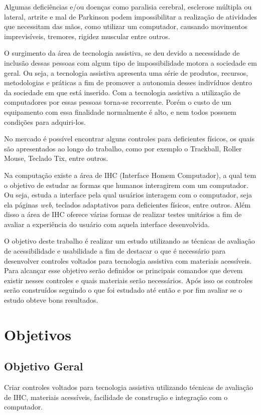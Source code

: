 \documentclass[
	12pt,			%
	openright,		%
	oneside,			%
	a4paper,			%
	chapter=TITLE,		%
	english,			%
	brazil,			%
	]{abntex2}
\begin{document}
Algumas deficiências e/ou doenças como paralisia cerebral, esclerose múltipla ou lateral, artrite e mal de Parkinson podem impossibilitar a realização de atividades que necessitam das mãos, como utilizar um computador, causando movimentos imprevisíveis, tremores, rigidez muscular entre outros.

O surgimento da área de tecnologia assistiva, se deu devido a necessidade de inclusão dessas pessoas com algum tipo de impossibilidade motora a sociedade em geral. Ou seja, a tecnologia assistiva apresenta uma série de produtos, recursos, metodologias e práticas a fim de promover a autonomia desses indivíduos dentro da sociedade em que está inserido. Com a tecnologia assistiva a utilização de computadores por essas pessoas torna-se recorrente. Porém o custo de um equipamento com essa finalidade normalmente é alto, e nem todos possuem condições para adquiri-los.

No mercado é possível encontrar alguns controles para deficientes físicos, os quais são apresentados ao longo do trabalho, como por exemplo o Trackball, Roller Mouse, Teclado Tix, entre outros.

Na computação existe a área de IHC (Interface Homem Computador), a qual tem o objetivo de estudar as formas que humanos interagirem com um computador. Ou seja, estuda a interface pela qual usuários interagem com o computador, seja ela páginas \emph{web}, teclados adaptativos para deficientes físicos, entre outros. Além disso a área de IHC oferece várias formas de realizar testes unitários a fim de avaliar a experiência do usuário com aquela interface desenvolvida.

O objetivo deste trabalho é realizar um estudo utilizando as técnicas de avaliação de acessibilidade e usabilidade a fim de destacar o que é necessário para desenvolver controles voltados para tecnologia assistiva com materiais acessíveis. Para alcançar esse objetivo serão definidos os principais comandos que devem existir nesses controles e quais materiais serão necessários. Após isso os controles serão construídos seguindo o que foi estudado até então e por fim avaliar se o estudo obteve bons resultados.

\section{Objetivos}
\label{obj}

\subsection{Objetivo Geral}
Criar controles voltados para tecnologia assistiva utilizando técnicas de avaliação de IHC, materiais acessíveis, facilidade de construção e integração com o computador.
\end{document}
